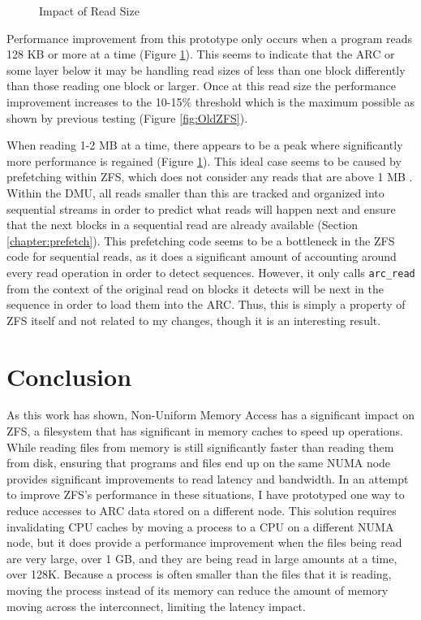 \begin{figure}[H]
    \centering
    \resizebox{0.75\linewidth}{!}{}
    \captionsetup{width=0.75\linewidth}
    \caption{Impact of Read Size}
    \label{fig:readsize}
\end{figure}

Performance improvement from this prototype only occurs when a program reads 128 KB or more at a time (Figure \ref{fig:readsize}).
This seems to indicate that the ARC or some layer below it may be handling read sizes of 
less than one block differently than those reading one block or larger.
Once at this read size the performance improvement increases to the 10-15\% threshold which is the maximum possible
as shown by previous testing (Figure \ref{fig:OldZFS}).

When reading 1-2 MB at a time, there appears to be a peak where significantly more performance is regained 
(Figure \ref{fig:readsize}).
This ideal case seems to be caused by prefetching within ZFS, which does not consider any reads that are above 1 MB
\cite[{module/zfs/dmu\_zfetch.c}]{zfs}.
Within the DMU, all reads smaller than this are tracked and organized into sequential streams in order to predict
what reads will happen next and ensure that the next blocks in a sequential read are already available 
(Section \ref{chapter:prefetch}).
This prefetching code seems to be a bottleneck in the ZFS code for sequential reads,
as it does a significant amount of accounting around every read operation in order to detect sequences.
However, it only calls \texttt{arc\_read} from the context of the original read 
on blocks it detects will be next in the sequence in order to load them into the ARC.
Thus, this is simply a property of ZFS itself and not related to my changes, though it is an interesting result.

\chapter{Conclusion}

As this work has shown, Non-Uniform Memory Access has a significant impact on ZFS,
a filesystem that has significant in memory caches to speed up operations.
While reading files from memory is still significantly faster than reading them from disk,
ensuring that programs and files end up on the same NUMA node provides significant improvements to read latency and bandwidth.
In an attempt to improve ZFS's performance in these situations, 
I have prototyped one way to reduce accesses to ARC data stored on a different node.
This solution requires invalidating CPU caches by moving a process to a CPU on a different
NUMA node, but it does provide a performance improvement when the files being read are very large, over 1 GB,
and they are being read in large amounts at a time, over 128K.
Because a process is often smaller than the files that it is reading, moving the process instead of its memory 
can reduce the amount of memory moving across the interconnect, limiting the latency impact.

